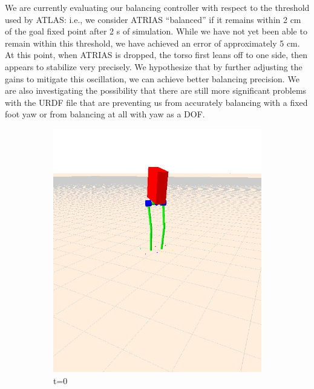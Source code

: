 \documentclass[letterpaper, 10 pt, conference]{ieeeconf}  %
\begin{document}
We are currently evaluating our balancing controller with respect to the threshold used by ATLAS: i.e., we consider ATRIAS “balanced” if it remains within 2 cm of the goal fixed point after 2 s of simulation. While we have not yet been able to remain within this threshold, we have achieved an error of approximately 5 cm. At this point, when ATRIAS is dropped, the torso first leans off to one side, then appears to stabilize very precisely. We hypothesize that by further adjusting the gains to mitigate this oscillation, we can achieve better balancing precision. We are also investigating the possibility that there are still more significant problems with the URDF file that are preventing us from accurately balancing with a fixed foot yaw or from balancing at all with yaw as a DOF. 

\begin{figure}[t]
  \centering
  \begin{subfigure}[b]{0.3\textwidth}
    \centering
    \includegraphics[width=\textwidth] {figures/balanceNoYaw1.jpg}
    \caption{t=0}
    \label{fig:balanceNoYaw1}
  \end{subfigure}\hfill
  \begin{subfigure}[b]{0.3\textwidth}

\end{subfigure}
\end{figure}
\end{document}

